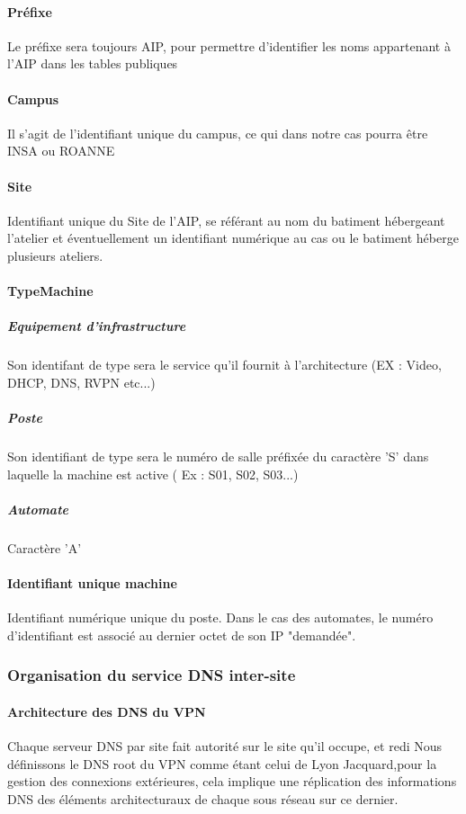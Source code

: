 \documentclass[a4paper]{article}
\begin{document}
\paragraph{Préfixe}
Le préfixe sera toujours AIP, pour permettre d'identifier les noms appartenant à l'AIP dans les tables publiques

\paragraph{Campus}
Il s'agit de l'identifiant unique du campus, ce qui dans notre cas pourra être INSA ou ROANNE

\paragraph{Site}
Identifiant unique du Site de l'AIP, se référant au nom du batiment hébergeant l'atelier et éventuellement un identifiant numérique au cas ou le batiment héberge plusieurs ateliers. 

\paragraph{TypeMachine}

\subparagraph{Equipement d'infrastructure}

Son identifant de type sera le service qu'il fournit à l'architecture (EX : Video, DHCP, DNS, RVPN etc...)

\subparagraph{Poste}

Son identifiant de type sera le numéro de salle préfixée du caractère 'S' dans laquelle la machine est active ( Ex : S01, S02, S03...)

\subparagraph{Automate}

Caractère 'A'

\paragraph{Identifiant unique machine}
Identifiant numérique unique du poste. Dans le cas des automates, le numéro d'identifiant est associé au dernier octet de son IP "demandée".

\subsubsection{Organisation du service DNS inter-site}

\paragraph{Architecture des DNS du VPN}
Chaque serveur DNS par site fait autorité sur le site qu'il occupe, et redi
Nous définissons le DNS root du VPN comme étant celui de Lyon Jacquard,pour la gestion des connexions extérieures,
cela implique une réplication des informations DNS des éléments architecturaux de chaque sous réseau sur ce dernier.
\end{document}
